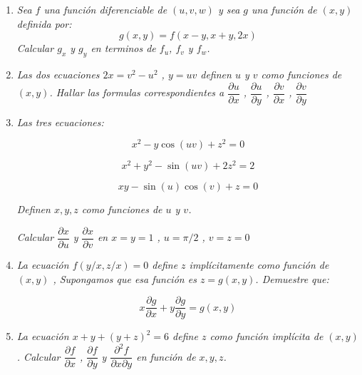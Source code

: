 \documentclass[12pt]{article}
\newcommand{\parcial}[2]{\dfrac{\partial #1}{\partial #2}}
\begin{document}
	\begin{enumerate}
		\item \textit{Sea $f$ una función diferenciable de $(u,v,w)$ y sea $g$ una función de $(x,y)$ definida por:}
		$$ g(x,y) = f(x-y,x+y,2x) $$
		\textit{Calcular $g_x$ y $g_y$ en terminos de $f_u$, $f_v$ y $f_w$.}
		
		\item \textit{Las dos ecuaciones $2x = v^2 - u^2$ , $y=uv$ definen $u$ y $v$ como funciones de $(x,y)$. Hallar las formulas correspondientes a $\parcial{u}{x}$ , $\parcial{u}{y}$ , $\parcial{v}{x}$ , $\parcial{v}{y}$}
		
		\item \textit{Las tres ecuaciones:}
		
		$$ x^2 - y \cos (uv) + z^2 = 0 $$
		
		$$ x^2 + y^2 - \sin (uv) + 2z^2 = 2 $$
		
		$$ xy - \sin (u) \cos (v) + z = 0 $$
		
		\textit{Definen $x,y,z$ como funciones de $u$ y $v$.}
		
		\bigskip
		
		\textit{Calcular $\parcial{x}{u}$ y $\parcial{x}{v}$ en $x=y=1$ , $u = \pi/2$ , $v = z = 0$}
		
		\item \textit{La ecuación $f(y/x,z/x) = 0$ define $z$ implícitamente como función de $(x,y)$ , Supongamos que esa función es $z = g(x,y)$. Demuestre que:}
		
		$$ x \parcial{g}{x} + y \parcial{g}{y} = g(x,y) $$
		
		\item \textit{La ecuación $x + y + (y+z)^2 = 6$ define $z$ como función implícita de $(x,y)$. Calcular $\parcial{f}{x}$ , $\parcial{f}{y}$ y $\dfrac{\partial^2 f}{\partial x \partial y}$ en función de $x,y,z$.}
		
		
		
		
	\end{enumerate}
	
\end{document}
